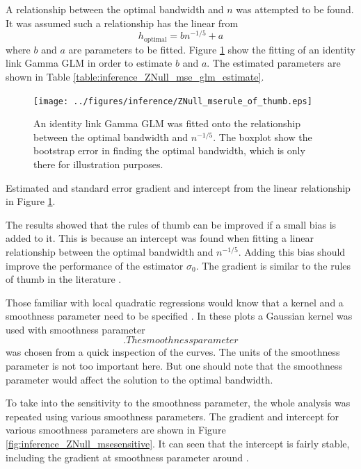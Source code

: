 A relationship between the optimal bandwidth and $n$ was attempted to be found. It was assumed such a relationship has the linear from
\begin{equation}
	h_{\text{optimal}} = b n^{-1/5} + a
\end{equation}
where $b$ and $a$ are parameters to be fitted. Figure \ref{fig:inference_ZNull_mserule_of_thumb} show the fitting of an identity link Gamma GLM in order to estimate $b$ and $a$. The estimated parameters are shown in Table \ref{table:inference_ZNull_mse_glm_estimate}.

\begin{figure}
	\centering
	\texttt{[image: ../figures/inference/ZNull\_mserule\_of\_thumb.eps]}
	\caption{An identity link Gamma GLM was fitted onto the relationship between the optimal bandwidth and $n^{-1/5}$. The boxplot show the bootstrap error in finding the optimal bandwidth, which is only there for illustration purposes.}
	\label{fig:inference_ZNull_mserule_of_thumb}
\end{figure}

\begin{table}
	\centering
	
	\caption{Estimated and standard error gradient and intercept from the linear relationship in Figure \ref{fig:inference_ZNull_mserule_of_thumb}.}
	\label{table:inference_ZNull_mse_glm_estimate}
\end{table}

The results showed that the rules of thumb can be improved if a small bias is added to it. This is because an intercept was found when fitting a linear relationship between the optimal bandwidth and $n^{-1/5}$. Adding this bias should improve the performance of the estimator $\widehat{\sigma}_0$. The gradient is similar to the rules of thumb in the literature \citep{sheather2004density}.

Those familiar with local quadratic regressions would know that a kernel and a smoothness parameter need to be specified \citep{friedman2001elements}. In these plots a Gaussian kernel was used with smoothness parameter $$. The smoothness parameter $$ was chosen from a quick inspection of the curves. The units of the smoothness parameter is not too important here. But one should note that the smoothness parameter would affect the solution to the optimal bandwidth.

To take into the sensitivity to the smoothness parameter, the whole analysis was repeated using various smoothness parameters. The gradient and intercept for various smoothness parameters are shown in Figure \ref{fig:inference_ZNull_msesensitive}. It can seen that the intercept is fairly stable, including the gradient at smoothness parameter around $$.

